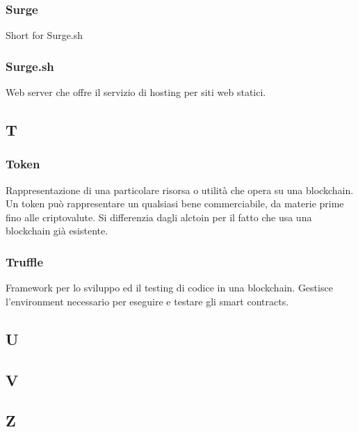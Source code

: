\subsubsection*{Surge}
Short for Surge.sh

\subsubsection*{Surge.sh}
Web server che offre il servizio di hosting per siti web statici.


\subsection*{T}

\subsubsection*{Token}
Rappresentazione di una particolare risorsa o utilità che opera su una blockchain\glo. Un token può rappresentare un qualsiasi bene commerciabile, da materie prime fino alle criptovalute. Si differenzia dagli alctoin per il fatto che usa una blockchain già esistente.

\subsubsection*{Truffle}
Framework per lo sviluppo ed il testing di codice in una blockchain\glo. Gestisce l'environment necessario per eseguire e testare gli smart contracts\glo.


\subsection*{U}


\subsection*{V}

\subsection*{Z}
